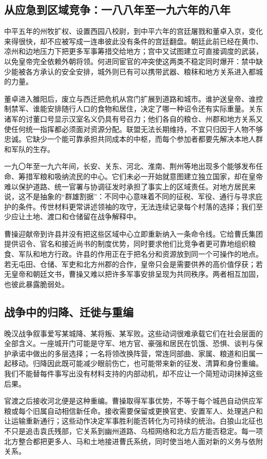 \subsection{从应急到区域竞争：一八八年至一九六年的八年}

中平五年的州牧扩权、设置西园八校尉，到中平六年的宫廷屠戮和董卓入京，变化来得很快，却不应被写成一连串彼此没有条件的宫廷翻盘。朝廷此前已经在黄巾、凉州和边地压力下把更多军事筹措交给地方；宫中又试图建立可直接调度的武装，以免皇帝完全依赖外朝将领。何进同宦官的冲突使这两类不稳定同时爆开：禁中缺少能被各方承认的安全安排，城外则已有可以携带武器、粮秣和地方关系进入都城的力量。

董卓进入雒阳后，废立与西迁把危机从宫门扩展到道路和城市。谁护送皇帝、谁控制禁军、谁能安排随行人口的食物和居住，决定了哪一种诏令还有实际重量。关东诸军的讨董口号显示汉室名义仍具有号召力；他们各自的粮仓、州郡和地方关系又使任何统一指挥都必须面对资源分配。联盟无法长期维持，不宜只归因于人物不够忠诚。它缺少一个能可靠承担共同成本的中枢，而每个参加者都要先解决本地人群和军队的生存。

一九〇年至一九六年间，长安、关东、河北、淮南、荆州等地出现多个能够发布任命、筹措军粮和吸纳流民的中心。它们未必一开始就意图建立独立国家，却在皇帝难以保护道路、统一官署与协调征发时承担了事实上的区域责任。对地方居民来说，这不是抽象的“群雄割据”：不同中心意味着不同的征税、军役、通行与寻求庇护的条件。传世材料更常讲述领袖的攻守，无法连续记录每个村落的选择；我们至少应让土地、渡口和仓储留在战争解释中。

曹操迎献帝到许县并没有把这些区域中心立即重新纳入一条命令线。它给曹氏集团提供诏令、官名和接近尚书的制度优势，同时要求他们比竞争者更可靠地组织粮食、军队和地方行政。许县的作用正在于把名分和资源放到同一个可操作的地点。若无屯田、仓储、军吏和北方州郡的合作，皇帝只会是需要供养的高价值俘获；若无皇帝和朝廷文书，曹操又难以把许多军事安排呈现为共同秩序。两者相互加固，也彼此暴露脆弱处。

\subsection{战争中的归降、迁徙与重编}

晚汉战争叙事爱写某城降、某将叛、某军败。这些动词很难承载它们在社会层面的全部含义。一座城开门可能是守军、地方官、豪强和居民在饥饿、恐惧、谈判与保护承诺中做出的多层选择；一名将领改换阵营，常连同部曲、家属、粮道和旧属一起移动。归降因此既可能减少眼前伤亡，也可能带来新的征发、清算和身份重编。我们不能替每件事写出没有材料支持的内部动机，却不应让一个简短动词抹掉这些后果。

官渡之后接收河北便是这种重编。曹操取得军事优势，不等于每个城邑自动供应军粮或每个旧属自动相信新任命。接收需要保留或更换官吏、安置军人、处理逃户和让运输重新通行；这些动作决定军事胜利能否转化为可持续的统治。白狼山北征也不只是追击袁氏残部，它关系到幽州道路、乌桓网络和北方后方能否稳定。每一项北方整合都把更多人、马和土地接进曹氏系统，同时使当地人面对新的义务与依附关系。

